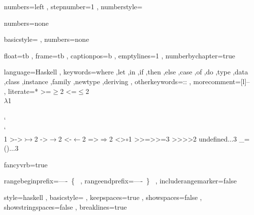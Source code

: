 \usepackage{fancyvrb}
\usepackage[scaled]{beramono}


    { numbers=left
    , stepnumber=1
    , numberstyle=\tiny
    }

    { numbers=none
    }

    {
    }

    { basicstyle=\color{red}\ttfamily
    , numbers=none
    }

    { float=tb
    , frame=tb
    , captionpos=b
    , emptylines=1
    , numberbychapter=true
    }

    { language=Haskell
    , keywords={where
               ,let
               ,in
               ,if
               ,then
               ,else
               ,case
               ,of
               ,do
               ,type
               ,data
               ,class
               ,instance
               ,family
               ,newtype
               ,deriving
               }
    , otherkeywords={::}
    , morecomment=[l]{--}
    , literate=*
        {>=}{{$\geq$}}2
        {<=}{{$\leq$}}2
        {\\}{{$\lambda$}}1
        {\\\\}{{\char`\\\char`\\}}1
        {>->}{{$\rightarrowtail$}}2
        {->}{{$\rightarrow$}}2
        {<-}{{$\leftarrow$}}2
        {=>}{{$\Rightarrow$}}2
        {<>}{{$\circ$}}1
        {>>=}{{>>=}}3
        {>>}{{>{>}}}2
        {undefined}{{$\ldots$}}3
        {_=()}{{$\ldots$}}3
    }

    { fancyvrb=true
    }

    { rangebeginprefix=----\ \{\ %
    , rangeendprefix=----\ \}\ %
    , includerangemarker=false
    }

\lstset
    { style=haskell
    , basicstyle=\fontsize{8}{10}\ttfamily
    , keepspaces=true
    , showspaces=false
    , showstringspaces=false
    , breaklines=true
    }

\lstset{ style=numbers
       , captionpos=b
       }

